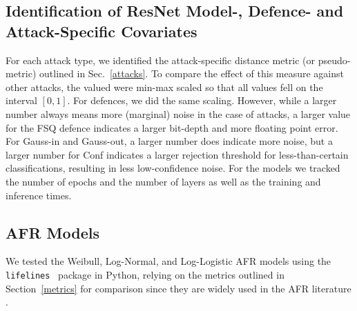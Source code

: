 \subsection{Identification of ResNet Model-, Defence- and Attack-Specific Covariates}
For each attack type, we identified the attack-specific distance metric (or pseudo-metric) outlined in Sec.~\ref{attacks}. To compare the effect of this measure against other attacks, the valued were min-max scaled so that all values fell on the interval $[0,1]$. For defences, we did the same scaling. However, while a larger number always means more (marginal) noise in the case of attacks, a larger value for the FSQ defence indicates a larger bit-depth and more floating point error. For Gauss-in and Gauss-out, a larger number does indicate more noise, but a larger number for Conf indicates a larger rejection threshold for less-than-certain classifications, resulting in less low-confidence noise. For the models we tracked the number of epochs and the number of layers as well as the training and inference times. 


\subsection{AFR Models}
We tested the Weibull, Log-Normal, and Log-Logistic AFR models using the \texttt{lifelines}~\citep{lifelines} package in Python, relying on the metrics outlined in Section~\ref{metrics} for comparison since they are widely used in the AFR literature \citep{aft_models}.
